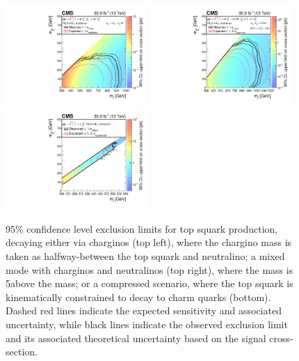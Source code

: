 \begin{figure}
	\centering
	\includegraphics[width=0.48\textwidth]{results/figs/interpretations/T2bW_35p9ifb_Moriond2017_Mar07_XSEC}
	\includegraphics[width=0.48\textwidth]{results/figs/interpretations/T2bt_35p9ifb_Moriond2017_Mar07_XSEC}
	\includegraphics[width=0.48\textwidth]{results/figs/interpretations/T2cc_35p9ifb_Moriond2017_Mar07_XSEC}
	\renewcommand{\baselinestretch}{1.0}
	\caption[95\% confidence level exclusion limits for top squark production.]{95\% confidence level exclusion limits for top squark production, decaying either via charginos (top left), where the chargino mass is taken as halfway-between the top squark and neutralino; a mixed mode with charginos and neutralinos (top right), where the \chipm mass is 5\GeV above the \lsp mass; or a compressed scenario, where the top squark is kinematically constrained to decay to charm quarks (bottom).  Dashed red lines indicate the expected sensitivity and associated uncertainty, while black lines indicate the observed exclusion limit and its associated theoretical uncertainty based on the signal cross-section.}
	\label{fig:limitsStop}
\end{figure}

